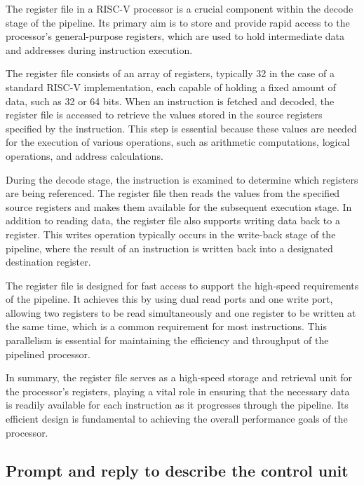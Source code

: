 \documentclass{article}
\begin{document}
\begin{spverbatim}
The register file in a RISC-V processor is a crucial 
component within the decode stage of the pipeline. 
Its primary aim is to store and provide rapid access 
to the processor's general-purpose registers, 
which are used to hold intermediate data and addresses during instruction execution.

The register file consists of an array of registers, 
typically 32 in the case of a standard RISC-V implementation, 
each capable of holding a fixed amount of data, such as 32 or 64 bits. 
When an instruction is fetched and decoded, the register file is accessed 
to retrieve the values stored in the source registers specified by the instruction. 
This step is essential because these values are needed 
for the execution of various operations, such as arithmetic computations, 
logical operations, and address calculations.

During the decode stage, the instruction is examined 
to determine which registers are being referenced. 
The register file then reads the values from the specified 
source registers and makes them available for the subsequent execution stage. 
In addition to reading data, the register file 
also supports writing data back to a register. 
This writes operation typically occurs in the write-back stage of the pipeline, 
where the result of an instruction is written back 
into a designated destination register.

The register file is designed for fast access 
to support the high-speed requirements of the pipeline. 
It achieves this by using dual read ports and one write port, 
allowing two registers to be read simultaneously 
and one register to be written at the same time, 
which is a common requirement for most instructions. 
This parallelism is essential for maintaining 
the efficiency and throughput of the pipelined processor.

In summary, the register file serves as a high-speed storage and 
retrieval unit for the processor's registers, 
playing a vital role in ensuring that the necessary data is readily 
available for each instruction as it progresses through the pipeline. 
Its efficient design is fundamental to achieving 
the overall performance goals of the processor.
\end{spverbatim}


\subsection{Prompt and reply to describe the control unit}\label{prompt:cu}
\end{document}
